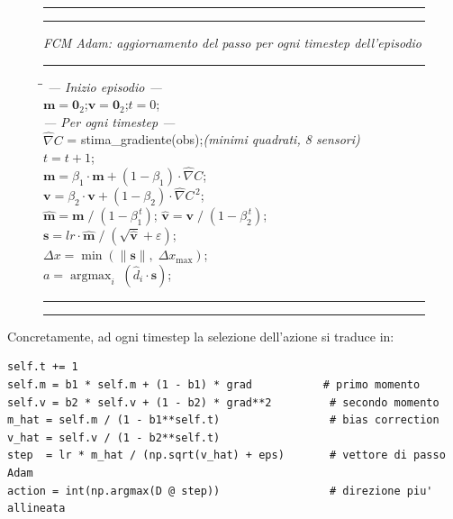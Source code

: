 \begin{figure}[H]
\noindent\rule{\linewidth}{0.8pt}\vspace{-3pt}
\noindent\rule{\linewidth}{0.4pt}
\vspace{4pt}

\noindent\textit{FCM Adam: aggiornamento del passo per ogni timestep dell'episodio}

\vspace{4pt}
\noindent\rule{\linewidth}{0.4pt}
\vspace{4pt}

\small
\begin{tabbing}
\hspace{2.2em}\=\hspace{2.2em}\=\kill
\textit{--- Inizio episodio ---}\\[4pt]
$\mathbf{m} = \mathbf{0}_2$;\quad $\mathbf{v} = \mathbf{0}_2$;\quad $t = 0$;\\[8pt]
\textit{--- Per ogni timestep ---}\\[4pt]
$\hat{\nabla}C$ = stima\_gradiente(obs);\quad\textit{(minimi quadrati, 8 sensori)}\\[4pt]
$t = t + 1$;\\[4pt]
$\mathbf{m} = \beta_1 \cdot \mathbf{m} + (1 - \beta_1) \cdot \hat{\nabla}C$;\\[4pt]
$\mathbf{v} = \beta_2 \cdot \mathbf{v} + (1 - \beta_2) \cdot \hat{\nabla}C^{\,2}$;\\[6pt]
$\hat{\mathbf{m}} = \mathbf{m}\;/\;(1 - \beta_1^{\,t})$;\quad
$\hat{\mathbf{v}} = \mathbf{v}\;/\;(1 - \beta_2^{\,t})$;\\[6pt]
$\mathbf{s} = lr \cdot \hat{\mathbf{m}}\;/\;(\sqrt{\hat{\mathbf{v}}} + \varepsilon)$;\\[4pt]
$\Delta x = \min(\|\mathbf{s}\|,\; \Delta x_{\max})$;\\[4pt]
$a = \operatorname{argmax}_i\;(\hat{d}_i \cdot \mathbf{s})$;
\end{tabbing}

\vspace{2pt}
\noindent\rule{\linewidth}{0.4pt}\vspace{-3pt}
\noindent\rule{\linewidth}{0.8pt}
\end{figure}

Concretamente, ad ogni timestep la selezione dell'azione si traduce in:

\begin{lstlisting}
self.t += 1
self.m = b1 * self.m + (1 - b1) * grad           # primo momento
self.v = b2 * self.v + (1 - b2) * grad**2         # secondo momento
m_hat = self.m / (1 - b1**self.t)                 # bias correction
v_hat = self.v / (1 - b2**self.t)
step  = lr * m_hat / (np.sqrt(v_hat) + eps)       # vettore di passo Adam
action = int(np.argmax(D @ step))                 # direzione piu' allineata
\end{lstlisting}


